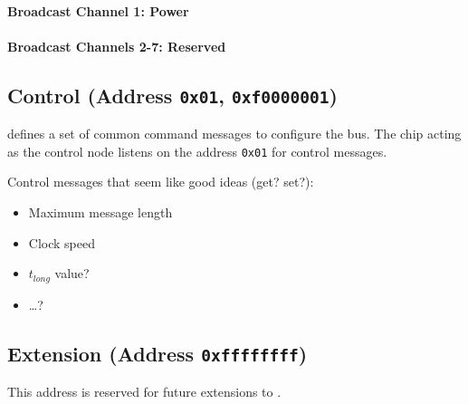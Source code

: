 \paragraph{Broadcast Channel 1: Power}

\paragraph{Broadcast Channels 2-7: Reserved}

\subsection{Control (Address \texttt{0x01}, \texttt{0xf0000001})}
\label{sec:control-control}
\bus defines a set of common command messages to configure the bus. The chip
acting as the control node listens on the address {\tt 0x01} for \bus control
messages.

Control messages that seem like good ideas (get? set?):
\begin{itemize}
  \item Maximum message length
  \item Clock speed
  \item $t_{long}$ value?
  \item \ldots?
\end{itemize}

\subsection{Extension (Address \texttt{0xffffffff})}
This address is reserved for future extensions to \bus.

